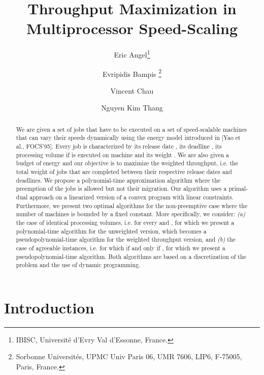 \documentclass[11pt,a4paper]{article}
\begin{document}
\title{Throughput Maximization in Multiprocessor Speed-Scaling}



\author{
   Eric Angel\footnote{IBISC, Universit\'e d'Evry Val d'Essonne, France.}\\
   \and
   Evripidis Bampis
   \footnote{Sorbonne Universit\'es, UPMC Univ Paris 06, UMR 7606, LIP6, F-75005, Paris, France.}\\
   \and
   Vincent Chau\\
   \and
   Nguyen Kim Thang
}

\date{}
\maketitle
\begin{abstract}
We are given a set of  jobs that have to be executed on a set of  speed-scalable machines that can vary their speeds dynamically using the energy model introduced in [Yao et al., FOCS'95]. Every job  is characterized by its release date , its deadline , its processing volume  if  is executed on machine  and its weight . We are also given a budget of energy  and our objective is to maximize the weighted throughput, i.e. the total weight of jobs that are completed between their respective release dates and deadlines. We propose a polynomial-time approximation algorithm where the preemption of the jobs is allowed but not their migration. Our algorithm uses a primal-dual approach on a linearized version of a convex program with linear constraints. Furthermore, we present two optimal algorithms for the non-preemptive case where the number of machines is bounded by a fixed constant. More specifically, we consider: {\em (a)} the case of identical processing volumes, i.e.  for every  and , for which we present a polynomial-time algorithm for the unweighted version, which becomes a pseudopolynomial-time algorithm for the weighted throughput version, and {\em (b)} the case of agreeable instances, i.e. for which  if and only if , for which we present a pseudopolynomial-time algorithm. Both algorithms are based on a discretization of the problem and the use of dynamic programming.
\end{abstract}



\section{Introduction}
\end{document}
